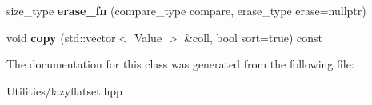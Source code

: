 \begin{DoxyCompactItemize}
\item 
\hypertarget{classrs_1_1_lazy_flat_set_a9a2b9f5c6ef29071724c5f4e9c060a61}{size\+\_\+type {\bfseries erase\+\_\+fn} (compare\+\_\+type compare, erase\+\_\+type erase=nullptr)}\label{classrs_1_1_lazy_flat_set_a9a2b9f5c6ef29071724c5f4e9c060a61}

\item 
\hypertarget{classrs_1_1_lazy_flat_set_aad6954260bbb8d00e3f4214edbac8d52}{void {\bfseries copy} (std\+::vector$<$ Value $>$ \&coll, bool sort=true) const }\label{classrs_1_1_lazy_flat_set_aad6954260bbb8d00e3f4214edbac8d52}

\end{DoxyCompactItemize}


The documentation for this class was generated from the following file\+:\begin{DoxyCompactItemize}
\item 
Utilities/lazyflatset.\+hpp\end{DoxyCompactItemize}

